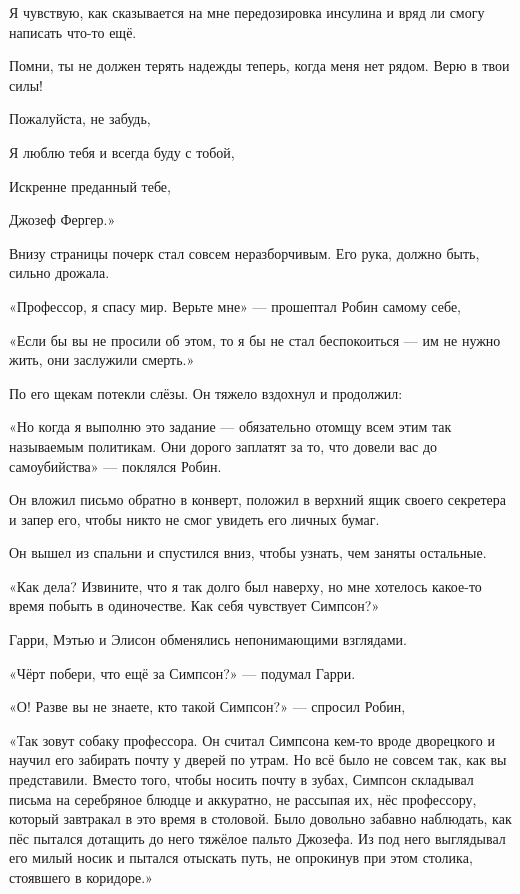 \documentclass[a5paper, 9pt,
final, openany, twoside=true]{memoir}
\begin{document}
Я чувствую, как сказывается на мне передозировка инсулина и вряд ли смогу написать что-то ещё.

Помни, ты не должен терять надежды теперь, когда меня нет рядом. Верю в твои силы!\bigskip

Пожалуйста, не забудь,\bigskip

Я люблю тебя и всегда буду с тобой,\bigskip

Искренне преданный тебе,\bigskip

Джозеф Фергер.»\bigskip

Внизу страницы почерк стал совсем неразборчивым. Его рука, должно быть, сильно дрожала.

«Профессор, я спасу мир. Верьте мне» — прошептал Робин самому себе,

«Если бы вы не просили об этом, то я бы не стал беспокоиться — им не нужно жить, они заслужили смерть.»

По его щекам потекли слёзы. Он тяжело вздохнул и продолжил:

«Но когда я выполню это задание — обязательно отомщу всем этим так называемым политикам. Они дорого заплатят за то, что довели вас до самоубийства» — поклялся Робин.

Он вложил письмо обратно в конверт, положил в верхний ящик своего секретера и запер его, чтобы никто не смог увидеть его личных бумаг.

Он вышел из спальни и спустился вниз, чтобы узнать, чем заняты остальные.

«Как дела? Извините, что я так долго был наверху, но мне хотелось какое-то время побыть в одиночестве. Как себя чувствует Симпсон?»

Гарри, Мэтью и Элисон обменялись непонимающими взглядами.

«Чёрт побери, что ещё за Симпсон?» — подумал Гарри.

«О! Разве вы не знаете, кто такой Симпсон?» — спросил Робин,

«Так зовут собаку профессора. Он считал Симпсона кем-то вроде дворецкого и научил его забирать почту у дверей по утрам. Но всё было не совсем так, как вы представили. Вместо того, чтобы носить почту в зубах, Симпсон складывал письма на серебряное блюдце и аккуратно, не рассыпая их, нёс профессору, который завтракал в это время в столовой. Было довольно забавно наблюдать, как пёс пытался дотащить до него тяжёлое пальто Джозефа. Из под него выглядывал его милый носик и пытался отыскать путь, не опрокинув при этом столика, стоявшего в коридоре.»
\end{document}
